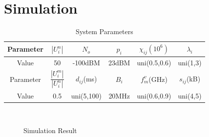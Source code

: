 \documentclass[conference]{IEEEtran}
\begin{document}
\section{Simulation} \label{sec:simulation}
\begin{table}[H]
\caption{System Parameters}
\begin{tabular}{|c|c|c|c|c|c|}
\hline
Parameter & $|U_i^n|$ &$N_o$ & $p_i$ &$\chi_{ij}(10^6)$&$\lambda_i$ \\ \hline
Value     & 50 & -100dBM & 23dBM &uni(0.5,0.6)  & uni(1,3) \\ \hline
Parameter &  $\dfrac{|U_i^m|}{|U_i^n|}$& $d_{ij}$(ms) &$B_i$ &$f_m^v$(GHz)&$s_{ij}$(kB) \\ \hline
Value    &0.5 &uni(5,100)&20MHz&uni(0.6,0.9)&uni(4,5)\\ \hline
\end{tabular}
\end{table}

\begin{figure}[H]
    \\
    \caption{Simulation Result}
    \label{fig:sim}
 \end{figure}


\end{document}
